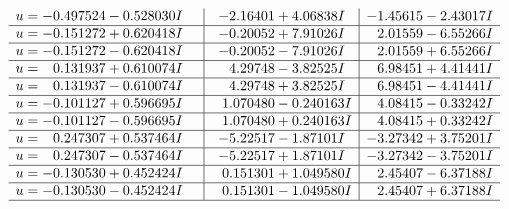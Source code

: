 \documentclass[1p]{elsarticle_modified}
\theoremstyle{definition}
\begin{document}
$$\begin{array}{c|c|c}
\begin{aligned}
u &= -0.497524 - 0.528030 I\end{aligned}
 & -2.16401 + 4.06838 I & -1.45615 - 2.43017 I \\ \hline\begin{aligned}
u &= -0.151272 + 0.620418 I\end{aligned}
 & -0.20052 + 7.91026 I & \phantom{-}2.01559 - 6.55266 I \\ \hline\begin{aligned}
u &= -0.151272 - 0.620418 I\end{aligned}
 & -0.20052 - 7.91026 I & \phantom{-}2.01559 + 6.55266 I \\ \hline\begin{aligned}
u &= \phantom{-}0.131937 + 0.610074 I\end{aligned}
 & \phantom{-}4.29748 - 3.82525 I & \phantom{-}6.98451 + 4.41441 I \\ \hline\begin{aligned}
u &= \phantom{-}0.131937 - 0.610074 I\end{aligned}
 & \phantom{-}4.29748 + 3.82525 I & \phantom{-}6.98451 - 4.41441 I \\ \hline\begin{aligned}
u &= -0.101127 + 0.596695 I\end{aligned}
 & \phantom{-}1.070480 - 0.240163 I & \phantom{-}4.08415 - 0.33242 I \\ \hline\begin{aligned}
u &= -0.101127 - 0.596695 I\end{aligned}
 & \phantom{-}1.070480 + 0.240163 I & \phantom{-}4.08415 + 0.33242 I \\ \hline\begin{aligned}
u &= \phantom{-}0.247307 + 0.537464 I\end{aligned}
 & -5.22517 - 1.87101 I & -3.27342 + 3.75201 I \\ \hline\begin{aligned}
u &= \phantom{-}0.247307 - 0.537464 I\end{aligned}
 & -5.22517 + 1.87101 I & -3.27342 - 3.75201 I \\ \hline\begin{aligned}
u &= -0.130530 + 0.452424 I\end{aligned}
 & \phantom{-}0.151301 + 1.049580 I & \phantom{-}2.45407 - 6.37188 I \\ \hline\begin{aligned}
u &= -0.130530 - 0.452424 I\end{aligned}
 & \phantom{-}0.151301 - 1.049580 I & \phantom{-}2.45407 + 6.37188 I\\
 \hline 
 \end{array}$$\newpage
\end{document}
